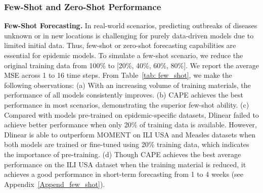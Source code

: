 \subsubsection{Few-Shot and Zero-Shot Performance} %

\textbf{Few-Shot Forecasting.} In real-world scenarios, predicting outbreaks of diseases unknown or in new locations is challenging for purely data-driven models due to limited initial data. Thus, few-shot or zero-shot forecasting capabilities are essential for epidemic models. To simulate a few-shot scenario, we reduce the original training data from 100\% to [20\%, 40\%, 60\%, 80\%]. We report the average MSE across 1 to 16 time steps. From Table~\ref{tab: few_shot}, we make the following observations: (a) With an increasing volume of training materials, the performance of all models consistently improves. (b) CAPE achieves the best performance in most scenarios, demonstrating the superior few-shot ability. (c) Compared with models pre-trained on epidemic-specific datasets, Dlinear failed to achieve better performance when only 20\% of training data is available. However, Dlinear is able to outperform MOMENT on ILI USA and Measles datasets when both models are trained or fine-tuned using 20\% training data, which indicates the importance of pre-training. (d) Though CAPE achieves the best average performance on the ILI USA dataset when the training material is reduced, it achieves a good performance in short-term forecasting from 1 to 4 weeks (see Appendix~\ref{Append_few_shot}).


